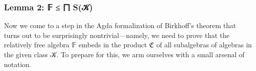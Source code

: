 \subsubsection{Lemma 2: 𝔽 ≤ ⨅ S(𝒦)}\label{lemma-2-ux1d53d-sux1d4a6}
Now we come to a step in the Agda formalization of Birkhoff's theorem that turns out to be surprisingly nontrivial---namely, we need to prove that the relatively free algebra \af 𝔽 embeds in the product \af ℭ of all subalgebras of algebras in the given class \ab 𝒦. To prepare for this, we arm ourselves with a small arsenal of notation.
\ccpad
\begin{code}%
\>[0][@{}l@{\AgdaIndent{1}}]%
\>[1]\AgdaSpace{}%
\AgdaSpace{}%
\AgdaSymbol{\{}\AgdaSpace{}%
\AgdaSymbol{=}\AgdaSpace{}%
\AgdaSymbol{\}\{}\AgdaSpace{}%
\AgdaSymbol{=}\AgdaSpace{}%
\AgdaSymbol{\}\{}\AgdaSpace{}%
\AgdaSymbol{=}\AgdaSpace{}%
\AgdaSymbol{\}}\AgdaSpace{}%
\AgdaSymbol{\{}\AgdaSpace{}%
\AgdaSymbol{=}\AgdaSpace{}%
\AgdaSymbol{\}}\<%
\\
%
\>[1]\AgdaSpace{}%
\AgdaSpace{}%
\AgdaSymbol{\{}\AgdaSpace{}%
\AgdaSymbol{=}\AgdaSpace{}%
\AgdaSymbol{\}\{}\AgdaSpace{}%
\AgdaSymbol{=}\AgdaSpace{}%
\AgdaSymbol{\}}\<%
\\
%
\\[\AgdaEmptyExtraSkip]%
%
\>[1]\<%
\\
%
\\[\AgdaEmptyExtraSkip]%
%
\>[1]\<%
\\
%
\>[1]\AgdaSpace{}%
\AgdaSymbol{:}\AgdaSpace{}%
\AgdaSpace{}%
\AgdaSpace{}%
\<%
\\
%
\>[1]\AgdaSpace{}%
\AgdaSymbol{=}\AgdaSpace{}%
\AgdaSpace{}%
\<%
\\
%
\\[\AgdaEmptyExtraSkip]%
%
\>[1]\<%
\\
%
\>[1]\AgdaSpace{}%
\AgdaSymbol{:}\AgdaSpace{}%
\AgdaSpace{}%
\AgdaSymbol{(}\AgdaSpace{}%
\AgdaSpace{}%
\AgdaSymbol{)}\AgdaSpace{}%
\<%
\\

\end{code}
